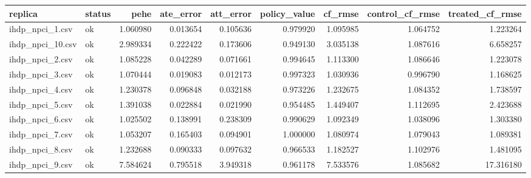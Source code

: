 \begin{tabular}{llrrrrrrr}
\toprule
replica & status & pehe & ate_error & att_error & policy_value & cf_rmse & control_cf_rmse & treated_cf_rmse \\
\midrule
ihdp_npci_1.csv & ok & 1.060980 & 0.013654 & 0.105636 & 0.979920 & 1.095985 & 1.064752 & 1.223264 \\
ihdp_npci_10.csv & ok & 2.989334 & 0.222422 & 0.173606 & 0.949130 & 3.035138 & 1.087616 & 6.658257 \\
ihdp_npci_2.csv & ok & 1.085228 & 0.042289 & 0.071661 & 0.994645 & 1.113300 & 1.086646 & 1.223078 \\
ihdp_npci_3.csv & ok & 1.070444 & 0.019083 & 0.012173 & 0.997323 & 1.030936 & 0.996790 & 1.168625 \\
ihdp_npci_4.csv & ok & 1.230378 & 0.096848 & 0.032188 & 0.973226 & 1.232675 & 1.084352 & 1.738597 \\
ihdp_npci_5.csv & ok & 1.391038 & 0.022884 & 0.021990 & 0.954485 & 1.449407 & 1.112695 & 2.423688 \\
ihdp_npci_6.csv & ok & 1.025502 & 0.138991 & 0.238309 & 0.990629 & 1.092349 & 1.038096 & 1.303380 \\
ihdp_npci_7.csv & ok & 1.053207 & 0.165403 & 0.094901 & 1.000000 & 1.080974 & 1.079043 & 1.089381 \\
ihdp_npci_8.csv & ok & 1.232688 & 0.090333 & 0.097632 & 0.966533 & 1.182527 & 1.102976 & 1.481095 \\
ihdp_npci_9.csv & ok & 7.584624 & 0.795518 & 3.949318 & 0.961178 & 7.533576 & 1.085682 & 17.316180 \\
\bottomrule
\end{tabular}
